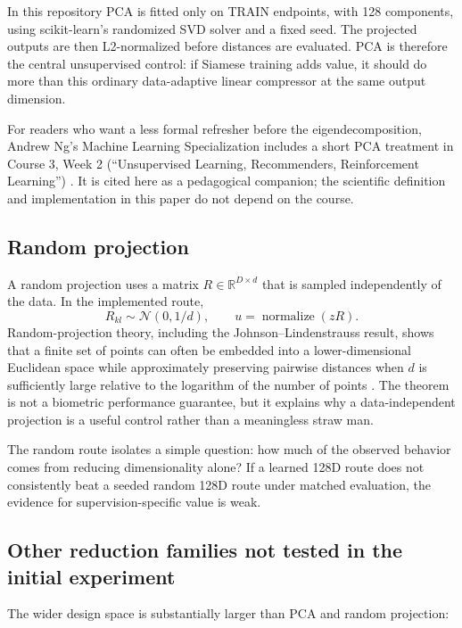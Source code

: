 \documentclass[10pt,a4paper]{article}
\begin{document}
In this repository PCA is fitted only on TRAIN endpoints, with 128 components, using
scikit-learn's randomized SVD solver and a fixed seed. The projected outputs are then
L2-normalized before distances are evaluated. PCA is therefore the central unsupervised
control: if Siamese training adds value, it should do more than this ordinary data-adaptive
linear compressor at the same output dimension.

For readers who want a less formal refresher before the eigendecomposition, Andrew Ng's
Machine Learning Specialization includes a short PCA treatment in Course 3, Week 2
(``Unsupervised Learning, Recommenders, Reinforcement Learning'') \cite{ngmls}. It is cited
here as a pedagogical companion; the scientific definition and implementation in this paper
do not depend on the course.

\subsection{Random projection}

A random projection uses a matrix $R\in\mathbb{R}^{D\times d}$ that is sampled independently
of the data. In the implemented route,
\begin{equation}
R_{kl}\sim\mathcal{N}(0,1/d),\qquad u=\operatorname{normalize}(zR).
\end{equation}
Random-projection theory, including the Johnson--Lindenstrauss result, shows that a finite
set of points can often be embedded into a lower-dimensional Euclidean space while
approximately preserving pairwise distances when $d$ is sufficiently large relative to the
logarithm of the number of points \cite{johnson1984,dasgupta2003}. The theorem is not a
biometric performance guarantee, but it explains why a data-independent projection is a
useful control rather than a meaningless straw man.

The random route isolates a simple question: how much of the observed behavior comes from
reducing dimensionality alone? If a learned 128D route does not consistently beat a seeded
random 128D route under matched evaluation, the evidence for supervision-specific value is
weak.

\subsection{Other reduction families not tested in the initial experiment}

The wider design space is substantially larger than PCA and random projection:
\end{document}
